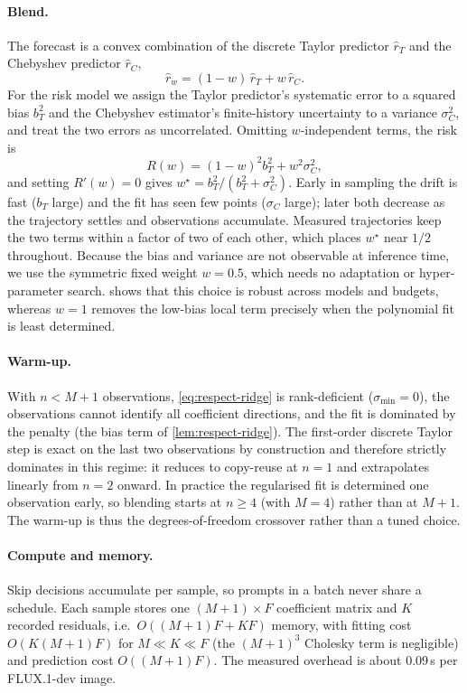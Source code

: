 \paragraph{Blend.} The forecast is a convex combination of the discrete Taylor predictor $\hat r_T$ and the Chebyshev predictor $\hat r_C$,
\begin{equation}
  \hat r_w = (1-w)\,\hat r_T + w\,\hat r_C .
\end{equation}
For the risk model we assign the Taylor predictor's systematic error to a squared bias $b_T^2$ and the Chebyshev estimator's finite-history uncertainty to a variance $\sigma_C^2$, and treat the two errors as uncorrelated. Omitting $w$-independent terms, the risk is
\begin{equation}\label{eq:respect-risk}
  R(w) = (1-w)^2 b_T^2 + w^2\sigma_C^2 ,
\end{equation}
and setting $R'(w)=0$ gives $w^\star = b_T^2/(b_T^2+\sigma_C^2)$. Early in sampling the drift is fast ($b_T$ large) and the fit has seen few points ($\sigma_C$ large); later both decrease as the trajectory settles and observations accumulate. Measured trajectories keep the two terms within a factor of two of each other, which places $w^\star$ near $1/2$ throughout. Because the bias and variance are not observable at inference time, we use the symmetric fixed weight $w=0.5$, which needs no adaptation or hyper-parameter search.  shows that this choice is robust across models and budgets, whereas $w=1$ removes the low-bias local term precisely when the polynomial fit is least determined.

\paragraph{Warm-up.} With $n<M+1$ observations, \cref{eq:respect-ridge} is rank-deficient ($\sigma_{\min}=0$), the observations cannot identify all coefficient directions, and the fit is dominated by the penalty (the bias term of \cref{lem:respect-ridge}). The first-order discrete Taylor step is exact on the last two observations by construction and therefore strictly dominates in this regime: it reduces to copy-reuse at $n=1$ and extrapolates linearly from $n=2$ onward. In practice the regularised fit is determined one observation early, so blending starts at $n\ge4$ (with $M=4$) rather than at $M+1$. The warm-up is thus the degrees-of-freedom crossover rather than a tuned choice.

\paragraph{Compute and memory.} Skip decisions accumulate per sample, so prompts in a batch never share a schedule. Each sample stores one $(M{+}1)\times F$ coefficient matrix and $K$ recorded residuals, i.e.\ $O((M+1)F+KF)$ memory, with fitting cost $O(K(M+1)F)$ for $M\ll K\ll F$ (the $(M+1)^3$ Cholesky term is negligible) and prediction cost $O((M+1)F)$. The measured overhead is about 0.09\,s per FLUX.1-dev image.

